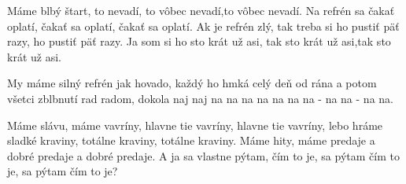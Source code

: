 \resetVars%
%
%
\MakeHeader%
\Lyrics%

Máme blbý štart, to nevadí, to vôbec nevadí,to vôbec nevadí.
Na refrén sa čakať oplatí, čakať sa oplatí, čakať sa oplatí.
Ak je refrén zlý, tak treba si ho pustiť päť razy, ho pustiť päť razy.
Ja som si ho sto krát už asi, tak sto krát už asi,tak sto krát už asi.

My máme silný refrén jak hovado,
každý ho hmká celý deň od rána
a potom všetci zblbnutí rad radom,
dokola naj naj na na na na na na
na - na na - na na.

Máme slávu, máme vavríny, hlavne tie vavríny, hlavne tie vavríny,
lebo hráme sladké kraviny, totálne kraviny, totálne kraviny.
Máme hity, máme predaje a dobré predaje a dobré predaje.
A ja sa vlastne pýtam, čím to je, sa pýtam čím to je, sa pýtam čím to je?

\Next

